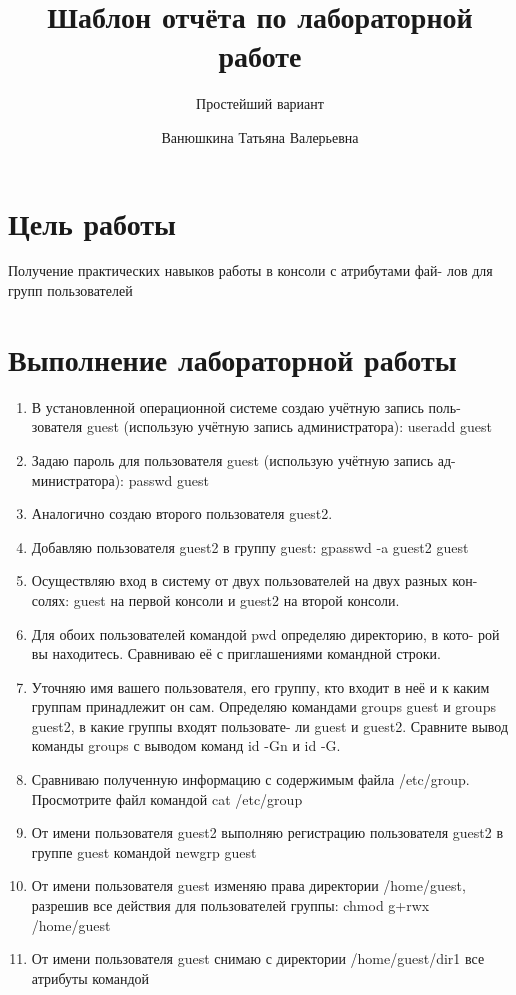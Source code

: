 \documentclass[
  12pt,
  a4paper,
  DIV=11,
  numbers=noendperiod]{scrreprt}
\title{Шаблон отчёта по лабораторной работе}
\subtitle{Простейший вариант}
\author{Ванюшкина Татьяна Валерьевна}
\date{}
\providecommand{\tightlist}{%
  \setlength{\itemsep}{0pt}\setlength{\parskip}{0pt}}\usepackage{longtable,booktabs,array}
\renewcommand*\contentsname{Содержание}
\newcommand\contentsname{Содержание}
\begin{document}
\maketitle

\renewcommand*\contentsname{Содержание}
{
\setcounter{tocdepth}{1}
\tableofcontents
}
\listoffigures
\listoftables

\chapter{Цель
работы}\label{ux446ux435ux43bux44c-ux440ux430ux431ux43eux442ux44b}

Получение практических навыков работы в консоли с атрибутами фай- лов
для групп пользователей

\chapter{Выполнение лабораторной
работы}\label{ux432ux44bux43fux43eux43bux43dux435ux43dux438ux435-ux43bux430ux431ux43eux440ux430ux442ux43eux440ux43dux43eux439-ux440ux430ux431ux43eux442ux44b}

\begin{enumerate}
\def\labelenumi{\arabic{enumi}.}
\tightlist
\item
  В установленной операционной системе создаю учётную запись поль-
  зователя guest (использую учётную запись администратора): useradd
  guest
\item
  Задаю пароль для пользователя guest (использую учётную запись ад-
  министратора): passwd guest
\item
  Аналогично создаю второго пользователя guest2.
\item
  Добавляю пользователя guest2 в группу guest: gpasswd -a guest2 guest
\item
  Осуществляю вход в систему от двух пользователей на двух разных кон-
  солях: guest на первой консоли и guest2 на второй консоли.
\item
  Для обоих пользователей командой pwd определяю директорию, в кото- рой
  вы находитесь. Сравниваю её с приглашениями командной строки.
\item
  Уточняю имя вашего пользователя, его группу, кто входит в неё и к
  каким группам принадлежит он сам. Определяю командами groups guest и
  groups guest2, в какие группы входят пользовате- ли guest и guest2.
  Сравните вывод команды groups с выводом команд id -Gn и id -G.
\item
  Сравниваю полученную информацию с содержимым файла /etc/group.
  Просмотрите файл командой cat /etc/group
\item
  От имени пользователя guest2 выполняю регистрацию пользователя guest2
  в группе guest командой newgrp guest
\item
  От имени пользователя guest изменяю права директории /home/guest,
  разрешив все действия для пользователей группы: chmod g+rwx
  /home/guest
\item
  От имени пользователя guest снимаю с директории /home/guest/dir1 все
  атрибуты командой
\end{enumerate}
\end{document}
